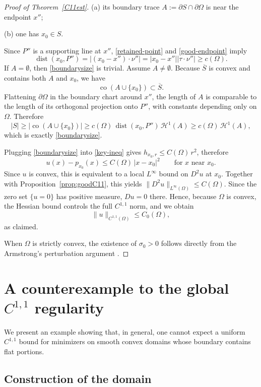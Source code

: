 \documentclass[reqno,11pt]{amsart}
\def\dist{{\mathop\mathrm{dist}}}
\numberwithin{equation}{section}
\theoremstyle{remark}
\begin{document}
\begin{proof}[Proof of Theorem~\ref{C11est}]
\smallskip
\noindent
(a) its boundary trace
$A:=\partial S\cap\partial\Omega$
is near the  endpoint $x''$;

\smallskip
\noindent
(b) one has $x_0\in S$.

Since $P''$ is a supporting line at $x''$, \eqref{retained-point} and
\eqref{good-endpoint} imply
\[
\dist(x_0,P'')
=
|(x_0-x'')\cdot \nu''| = |x_0-x''||\tau \cdot \nu''|
\ge c(\Omega).
\]
If $A=\emptyset$, then \eqref{boundarysize} is trivial. Assume $A\neq\emptyset$.
Because $\overline S$ is convex and contains both $A$ and $x_0$, we have
\[
\operatorname{co}(A\cup\{x_0\})\subset \overline S.
\]
Flattening $\partial\Omega$ in the boundary chart around $x''$, the length of
$A$ is comparable to the length of its orthogonal projection onto $P''$, with
constants depending only on $\Omega$. Therefore
\[
|S|
\ge \bigl|\operatorname{co}(A\cup\{x_0\})\bigr|
\ge c(\Omega)\,\dist(x_0,P'')\,\mathscr H^1(A)
\ge c(\Omega)\,\mathscr H^1(A),
\]
which is exactly \eqref{boundarysize}.

Plugging \eqref{boundarysize} into \eqref{key-ineq} gives $h_{x_0,r}\le C(\Omega)\,r^2$, therefore 
\[
u(x)-p_{x_0}(x)\le C(\Omega)\,|x-x_0|^2
\qquad\text{for }x\text{ near }x_0.
\]
Since $u$ is convex, this is equivalent to a local $L^\infty$ bound on $D^2u$ at $x_0$.
Together with Proposition~\ref{prop:goodC11}, this yields $\|D^2u\|_{L^\infty(\Omega)}\le C(\Omega)$.
Since the zero set 
$\{u=0\}$ has positive measure, $Du=0$ there. Hence, because $\Omega$ is convex, the Hessian bound controls the full $C^{1,1}$ norm, and we obtain
\[
\|u\|_{C^{1,1}(\Omega)}\le C_0(\Omega),
\]
as claimed.

When $\Omega$ is strictly convex, the existence of $\sigma_0>0$ follows directly from the  Armstrong's perturbation argument \cite{A1996}.
\end{proof}


\section{A counterexample to the global $C^{1,1}$ regularity}\label{sec3}

We present an example showing that, in general, one cannot expect a uniform
$C^{1,1}$ bound for minimizers on smooth convex domains whose boundary contains
flat portions.

\subsection{Construction of the domain}
\end{document}
